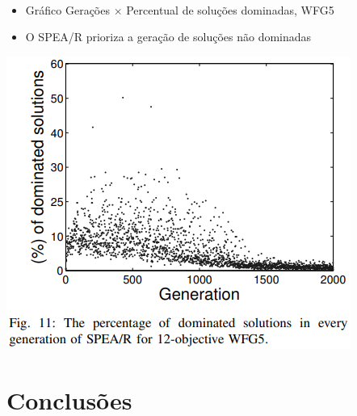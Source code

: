 \documentclass{rbfin}
\begin{document}
\newpage

$\,$

\vspace{30mm}

\begin{itemize}
  \item Gráfico Gerações $\times$ Percentual de soluções dominadas, WFG5
  \item O SPEA/R prioriza a geração de soluções não dominadas 
\end{itemize}

\begin{center}
\includegraphics[scale=1]{fig11}
\end{center}

\newpage
\section{Conclusões}

\vspace{6mm}
\end{document}
